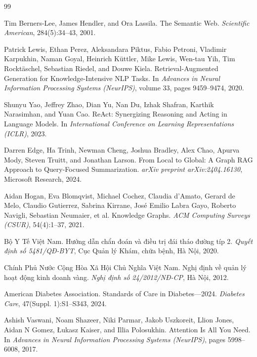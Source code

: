 \documentclass[12pt,a4paper]{report}
\begin{document}
\newpage

\begin{thebibliography}{99}

Tim Berners-Lee, James Hendler, and Ora Lassila.
\newblock The Semantic Web.
\newblock \emph{Scientific American}, 284(5):34--43, 2001.

Patrick Lewis, Ethan Perez, Aleksandara Piktus, Fabio Petroni, Vladimir Karpukhin, Naman Goyal, Heinrich K{\"u}ttler, Mike Lewis, Wen-tau Yih, Tim Rockt{\"a}schel, Sebastian Riedel, and Douwe Kiela.
\newblock Retrieval-Augmented Generation for Knowledge-Intensive NLP Tasks.
\newblock In \emph{Advances in Neural Information Processing Systems (NeurIPS)}, volume 33, pages 9459--9474, 2020.

Shunyu Yao, Jeffrey Zhao, Dian Yu, Nan Du, Izhak Shafran, Karthik Narasimhan, and Yuan Cao.
\newblock ReAct: Synergizing Reasoning and Acting in Language Models.
\newblock In \emph{International Conference on Learning Representations (ICLR)}, 2023.

Darren Edge, Ha Trinh, Newman Cheng, Joshua Bradley, Alex Chao, Apurva Mody, Steven Truitt, and Jonathan Larson.
\newblock From Local to Global: A Graph RAG Approach to Query-Focused Summarization.
\newblock \emph{arXiv preprint arXiv:2404.16130}, Microsoft Research, 2024.

Aidan Hogan, Eva Blomqvist, Michael Cochez, Claudia d'Amato, Gerard de Melo, Claudio Gutierrez, Sabrina Kirrane, Jos{\'e} Emilio Labra Gayo, Roberto Navigli, Sebastian Neumaier, et al.
\newblock Knowledge Graphs.
\newblock \emph{ACM Computing Surveys (CSUR)}, 54(4):1--37, 2021.

Bộ Y Tế Việt Nam.
\newblock Hướng dẫn chẩn đoán và điều trị đái tháo đường típ 2.
\newblock \emph{Quyết định số 5481/QĐ-BYT}, Cục Quản lý Khám, chữa bệnh, Hà Nội, 2020.

Chính Phủ Nước Cộng Hòa Xã Hội Chủ Nghĩa Việt Nam.
\newblock Nghị định về quản lý hoạt động kinh doanh vàng.
\newblock \emph{Nghị định số 24/2012/NĐ-CP}, Hà Nội, 2012.

American Diabetes Association.
\newblock Standards of Care in Diabetes—2024.
\newblock \emph{Diabetes Care}, 47(Suppl. 1):S1--S343, 2024.

Ashish Vaswani, Noam Shazeer, Niki Parmar, Jakob Uszkoreit, Llion Jones, Aidan N Gomez, {\L}ukasz Kaiser, and Illia Polosukhin.
\newblock Attention Is All You Need.
\newblock In \emph{Advances in Neural Information Processing Systems (NeurIPS)}, pages 5998--6008, 2017.

\end{thebibliography}
\end{document}
